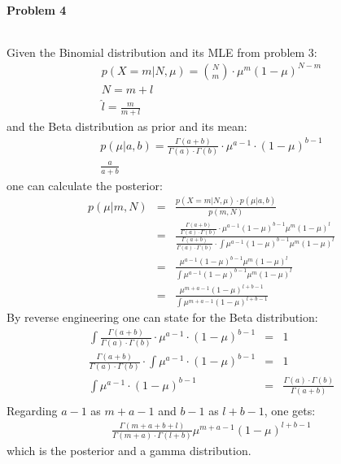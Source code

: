 \documentclass{article}
\begin{document}
\paragraph*{Problem 4}
$\;$ 

Given the Binomial distribution and its MLE from problem 3:
\begin{eqnarray}
p(X=m | N,\mu) = {N \choose m} \cdot \mu ^m (1- \mu)^{N-m}\\
N = m+l\\
\hat{l} = \frac{m}{m+l}
\end{eqnarray}
and the Beta distribution as prior and its mean:
\begin{eqnarray}
p(\mu | a,b) = \frac{\Gamma(a+b)}{\Gamma(a) \cdot \Gamma(b)} \cdot \mu^{a-1} \cdot (1-\mu)^{b-1}\\
\frac{a}{a+b}
\end{eqnarray}
one can calculate the posterior:
\begin{eqnarray}
p(\mu | m,N) &=& \frac{p(X=m | N,\mu) \cdot p(\mu | a,b)}{p(m,N)}\\
 &=&  \frac{\frac{\Gamma(a+b)}{\Gamma(a)\cdot \Gamma(b)} \cdot \mu ^{a-1} (1-\mu)^{b-1} \mu^{m} (1-\mu)^l}{\frac{\Gamma(a+b)}{\Gamma(a)\cdot \Gamma(b)} \cdot \int \mu^{a-1} (1-\mu)^{b-1}\mu^m(1-\mu)^l} \\
 &=&  \frac{\mu ^{a-1} (1-\mu)^{b-1} \mu^{m} (1-\mu)^l}{\int \mu^{a-1} (1-\mu)^{b-1}\mu^m(1-\mu)^l} \\
  &=&  \frac{\mu ^{m+a-1} (1-\mu)^{l+b-1}}{\int \mu^{m+a-1} (1-\mu)^{l+b-1}}
\end{eqnarray}
By reverse engineering one can state for the Beta distribution:
\begin{eqnarray}
\int \frac{\Gamma(a+b)}{\Gamma(a) \cdot \Gamma(b)} \cdot \mu^{a-1} \cdot (1-\mu)^{b-1} &=& 1\\
 \frac{\Gamma(a+b)}{\Gamma(a) \cdot \Gamma(b)} \cdot \int  \mu^{a-1} \cdot (1-\mu)^{b-1} &=& 1\\
 \int  \mu^{a-1} \cdot (1-\mu)^{b-1} &=& \frac{\Gamma(a) \cdot \Gamma(b)}{\Gamma(a+b)}\\
\end{eqnarray}
Regarding $a-1$ as $m+a-1$ and $b-1$ as $l+b-1$, one gets:
\begin{eqnarray}
\frac{\Gamma(m+a+b+l)}{\Gamma(m+a) \cdot \Gamma(l+b)}\mu^{m+a-1}(1-\mu)^{l+b-1}
\end{eqnarray}
which is the posterior and a gamma distribution.
\end{document}
